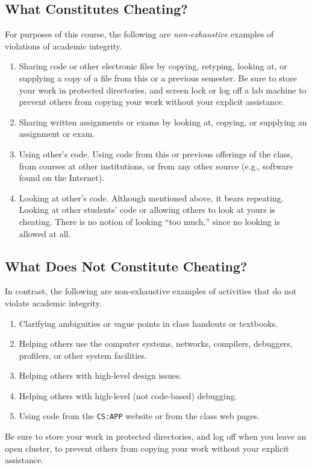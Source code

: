 \documentclass{article}
\begin{document}
\subsection{What Constitutes Cheating?}
\label{sec:orgheadline14}

For purposes of this course, the following are \emph{non-exhaustive} examples of violations of
academic integrity.

\begin{enumerate}
\item Sharing code or other electronic files by copying, retyping, looking at, or supplying a
copy of a file from this or a previous semester. Be sure to store your work in
protected directories, and screen lock or log off a lab machine to prevent others from
copying your work without your explicit assistance.
\item Sharing written assignments or exams by looking at, copying, or supplying an assignment
or exam.
\item Using other's code. Using code from this or previous offerings of the class, from
courses at other institutions, or from any other source (e.g., software found on the
Internet).
\item Looking at other's code. Although mentioned above, it bears repeating. Looking at other
students' code or allowing others to look at yours is cheating. There is no notion of
looking “too much,” since no looking is allowed at all.
\end{enumerate}

\subsection{What Does Not Constitute Cheating?}
\label{sec:orgheadline15}

In contrast, the following are non-exhaustive examples of activities that do not violate
academic integrity.

\begin{enumerate}
\item Clarifying ambiguities or vague points in class handouts or textbooks.
\item Helping others use the computer systems, networks, compilers, debuggers, profilers, or
other system facilities.
\item Helping others with high-level design issues.
\item Helping others with high-level (not code-based) debugging.
\item Using code from the \texttt{CS:APP} website or from the class web pages.
\end{enumerate}

Be sure to store your work in protected directories, and log off when you leave an open
cluster, to prevent others from copying your work without your explicit assistance.



\end{document}
